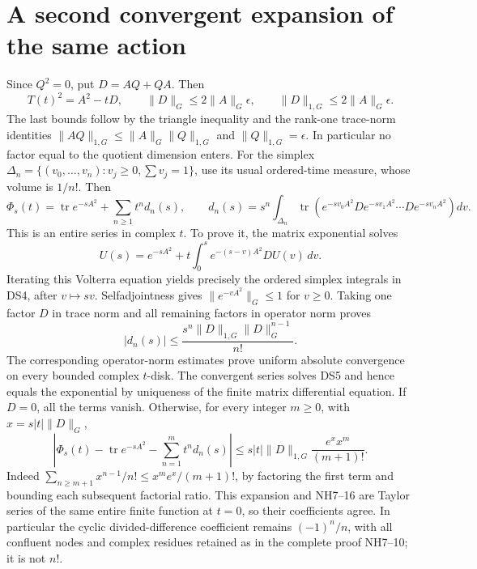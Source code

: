 \documentclass[11pt]{article}
\newcommand{\tr}{\operatorname{tr}}
\begin{document}
\section{A second convergent expansion of the same action}
Since \(Q^2=0\), put \(D=AQ+QA\). Then
\[
 T(t)^2=A^2-tD,\qquad
 \|D\|_G\le 2\|A\|_G\epsilon,\qquad
 \|D\|_{1,G}\le 2\|A\|_G\epsilon .
 \tag{DS3}
\]
The last bounds follow by the triangle inequality and the rank-one
trace-norm identities \(\|AQ\|_{1,G}\le\|A\|_G\|Q\|_{1,G}\) and
\(\|Q\|_{1,G}=\epsilon\). In particular no factor equal to the quotient
dimension enters.
For the simplex
\(\Delta_n=\{(v_0,\ldots,v_n):v_j\ge0,\sum v_j=1\}\), use its usual
ordered-time measure, whose volume is \(1/n!\). Then
\[
 \Phi_s(t)=\tr e^{-sA^2}+\sum_{n\ge1}t^n d_n(s),\qquad
 d_n(s)=s^n\int_{\Delta_n}
 \tr\!\left(e^{-sv_0A^2}D e^{-sv_1A^2}\cdots D e^{-sv_nA^2}\right)dv .
 \tag{DS4}
\]
This is an entire series in complex \(t\). To prove it, the matrix
exponential solves
\[
 U(s)=e^{-sA^2}
       +t\int_0^s e^{-(s-v)A^2}D U(v)\,dv.
 \tag{DS5}
\]
Iterating this Volterra equation yields precisely the ordered simplex
integrals in DS4, after \(v\mapsto sv\). Selfadjointness gives
\(\|e^{-vA^2}\|_G\le1\) for \(v\ge0\).
Taking one factor \(D\) in trace norm and all remaining factors in
operator norm proves
\[
 |d_n(s)|\le \frac{s^n\|D\|_{1,G}\|D\|_G^{n-1}}{n!}.
 \tag{DS6}
\]
The corresponding operator-norm estimates prove uniform absolute
convergence on every bounded complex \(t\)-disk. The convergent series
solves DS5 and hence equals the exponential by uniqueness of the finite
matrix differential equation. If \(D=0\), all the terms vanish.
Otherwise, for every integer \(m\ge0\), with \(x=s|t|\|D\|_G\),
\[
 \left|\Phi_s(t)-\tr e^{-sA^2}-\sum_{n=1}^m t^nd_n(s)\right|
 \le s|t|\|D\|_{1,G}\frac{e^x x^m}{(m+1)!}.
 \tag{DS7}
\]
Indeed \(\sum_{n\ge m+1}x^{n-1}/n!
\le x^m e^x/(m+1)!\), by factoring the first term and bounding each
subsequent factorial ratio. This expansion and NH7--16 are Taylor
series of the same entire finite function at \(t=0\), so their
coefficients agree. In particular the cyclic divided-difference
coefficient remains \((-1)^n/n\), with all confluent nodes and complex
residues retained as in the complete proof NH7--10; it is not \(n!\).
\end{document}
